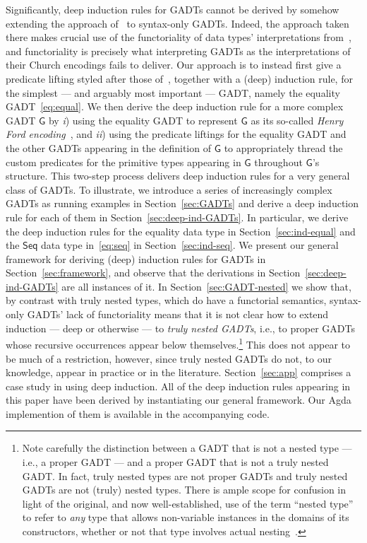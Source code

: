 \documentclass[sigplan,10pt,anonymous,review]{acmart}
\begin{document}
Significantly, deep induction rules for GADTs cannot be derived by
somehow extending the approach of~\cite{jp20} to syntax-only
GADTs. Indeed, the approach taken there makes crucial use of the
functoriality of data types' interpretations from~\cite{jp19}, and
functoriality is precisely what interpreting GADTs as the
interpretations of their Church encodings fails to deliver. Our
approach is to instead first give a predicate lifting styled after
those of~\cite{jp20}, together with a (deep) induction rule, for the
simplest --- and arguably most important --- GADT, namely the equality
GADT~\eqref{eq:equal}. We then derive the deep induction rule for a
more complex GADT $\mathsf{G}$ by {\em i}) using the equality GADT to
represent $\mathsf{G}$ as its so-called {\em Henry Ford
  encoding}~\cite{ch03,hin03,mcb99,sjsv09,sp04}, and {\em ii}) using
the predicate liftings for the equality GADT and the other GADTs
appearing in the definition of $\mathsf{G}$ to appropriately thread
the custom predicates for the primitive types appearing in
$\mathsf{G}$ throughout $\mathsf{G}$'s structure. This two-step
process delivers deep induction rules for a very general class of
GADTs. To illustrate, we introduce a series of increasingly complex
GADTs as running examples in Section~\ref{sec:GADTs} and derive a deep
induction rule for each of them in
Section~\ref{sec:deep-ind-GADTs}. In particular, we derive the deep
induction rules for the equality data type in
Section~\ref{sec:ind-equal} and the $\mathsf{Seq}$ data type
in~\eqref{eq:seq} in Section~\ref{sec:ind-seq}. We present our general
framework for deriving (deep) induction rules for GADTs in
Section~\ref{sec:framework}, and observe that the derivations in
Section~\ref{sec:deep-ind-GADTs} are all instances of it.  In
Section~\ref{sec:GADT-nested} we show that, by contrast with truly
nested types, which do have a functorial semantics, syntax-only GADTs'
lack of functoriality means that it is not clear how to extend
induction --- deep or otherwise --- to {\em truly nested GADTs}, i.e.,
to proper GADTs whose recursive occurrences appear below
themselves.\footnote{Note carefully the distinction between a GADT
  that is not a nested type --- i.e., a proper GADT --- and a proper
  GADT that is not a truly nested GADT.  In fact, truly nested types
  are not proper GADTs and truly nested GADTs are not (truly) nested
  types. There is ample scope for confusion in light of the original,
  and now well-established, use of the term ``nested type'' to refer
  to {\em any} type that allows non-variable instances in the domains
  of its constructors, whether or not that type involves actual
  nesting~\cite{bm98}.}  This does not appear to be much of a
restriction, however, since truly nested GADTs do not, to our
knowledge, appear in practice or in the
literature. Section~\ref{sec:app} comprises a case study in using deep
induction. All of the deep induction rules appearing in this paper
have been derived by instantiating our general framework. Our Agda
implemention of them is available in the accompanying code.
\end{document}
